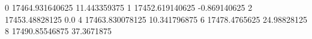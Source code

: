 0 17464.931640625 11.443359375
1 17452.619140625 -0.869140625
2 17453.48828125 0.0
4 17463.830078125 10.341796875
6 17478.4765625 24.98828125
8 17490.85546875 37.3671875
